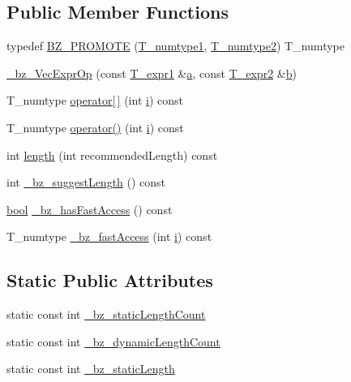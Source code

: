 \subsection*{Public Member Functions}
\begin{DoxyCompactItemize}
\item 
typedef \hyperlink{class__bz__VecExprOp_a4e60f7d4a3e438478fa8d49af850bee7}{B\+Z\+\_\+\+P\+R\+O\+M\+O\+T\+E} (\hyperlink{class__bz__VecExprOp_a5d79220111e0ccb5eba1a38fe56a84da}{T\+\_\+numtype1}, \hyperlink{class__bz__VecExprOp_a0fb2e4b1c56e90377f43ace8fff224a0}{T\+\_\+numtype2}) T\+\_\+numtype
\item 
\hyperlink{class__bz__VecExprOp_a291d7cbebe5f77d950a4b434f78eb616}{\+\_\+bz\+\_\+\+Vec\+Expr\+Op} (const \hyperlink{class__bz__VecExprOp_a9607226603810860fe37bed664ea50b3}{T\+\_\+expr1} \&\hyperlink{gen__mat5files_8m_aae328bf20413f220e38aec4d95bfd6da}{a}, const \hyperlink{class__bz__VecExprOp_ad69392f01f10ddeab59e0aece0e942ff}{T\+\_\+expr2} \&\hyperlink{gen__mat5files_8m_a7b38767b3b6a8dae167e5afa4fc340b0}{b})
\item 
T\+\_\+numtype \hyperlink{class__bz__VecExprOp_a2f51102c92a00167aba92bb3767c5364}{operator\mbox{[}$\,$\mbox{]}} (int \hyperlink{indexexpr_8h_aabd77643995707c185e95c8cb2782c81}{i}) const 
\item 
T\+\_\+numtype \hyperlink{class__bz__VecExprOp_ac88a1f8f0cb293b4a65297bdf36ef3e6}{operator()} (int \hyperlink{indexexpr_8h_aabd77643995707c185e95c8cb2782c81}{i}) const 
\item 
int \hyperlink{class__bz__VecExprOp_a5bd8ff2d9cd1d45a530504d78895e027}{length} (int recommended\+Length) const 
\item 
int \hyperlink{class__bz__VecExprOp_a0e9b88ad39bc1efac177f2ab4186e062}{\+\_\+bz\+\_\+suggest\+Length} () const 
\item 
\hyperlink{compiler_8h_abb452686968e48b67397da5f97445f5b}{bool} \hyperlink{class__bz__VecExprOp_a49caf00f4445266dc41f7963236b9d29}{\+\_\+bz\+\_\+has\+Fast\+Access} () const 
\item 
T\+\_\+numtype \hyperlink{class__bz__VecExprOp_ad13cd239deb56dfc07af7e81d076e42b}{\+\_\+bz\+\_\+fast\+Access} (int \hyperlink{indexexpr_8h_aabd77643995707c185e95c8cb2782c81}{i}) const 
\end{DoxyCompactItemize}
\subsection*{Static Public Attributes}
\begin{DoxyCompactItemize}
\item 
static const int \hyperlink{class__bz__VecExprOp_a455a5f2093233866fd4389d1d112b832}{\+\_\+bz\+\_\+static\+Length\+Count}
\item 
static const int \hyperlink{class__bz__VecExprOp_a3bec9e168eb9499ee1da36f1e312cc86}{\+\_\+bz\+\_\+dynamic\+Length\+Count}
\item 
static const int \hyperlink{class__bz__VecExprOp_a03cb35cdacca2c42367caf5ff83ed34b}{\+\_\+bz\+\_\+static\+Length}
\end{DoxyCompactItemize}


